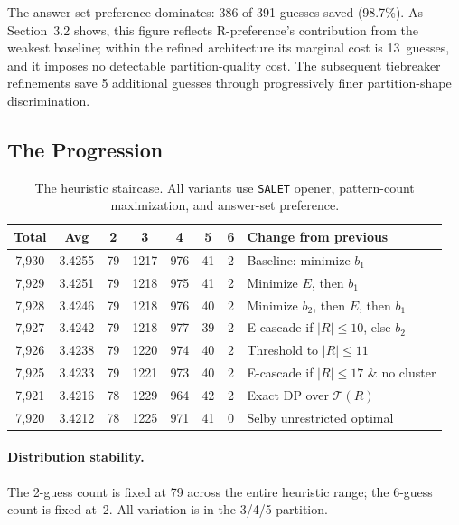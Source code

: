 \documentclass[11pt]{article}
\begin{document}
	The answer-set preference dominates: 386 of 391 guesses saved (98.7\%).  As Section~3.2 shows, this figure reflects R-preference's contribution from the weakest baseline; within the refined architecture its marginal cost is 13~guesses, and it imposes no detectable partition-quality cost.  The subsequent tiebreaker refinements save 5 additional guesses through progressively finer partition-shape discrimination.
	
	\subsection{The Progression}
	
	\begin{table}[h]
		\centering
		\caption{The heuristic staircase.  All variants use \texttt{SALET} opener, pattern-count maximization, and answer-set preference.}
		\label{tab:staircase}
		\begin{tabular}{@{}cccccccl@{}}
			\toprule
			Total & Avg & 2 & 3 & 4 & 5 & 6 & Change from previous \\
			\midrule
			7,930 & 3.4255 & 79 & 1217 & 976 & 41 & 2 & Baseline: minimize $b_1$ \\
			7,929 & 3.4251 & 79 & 1218 & 975 & 41 & 2 & Minimize $E$, then $b_1$ \\
			7,928 & 3.4246 & 79 & 1218 & 976 & 40 & 2 & Minimize $b_2$, then $E$, then $b_1$ \\
			7,927 & 3.4242 & 79 & 1218 & 977 & 39 & 2 & E-cascade if $|R| \leq 10$, else $b_2$ \\
			7,926 & 3.4238 & 79 & 1220 & 974 & 40 & 2 & Threshold to $|R| \leq 11$ \\
			7,925 & 3.4233 & 79 & 1221 & 973 & 40 & 2 & E-cascade if $|R| \leq 17$ \& no cluster \\
			\midrule
			7,921 & 3.4216 & 78 & 1229 & 964 & 42 & 2 & Exact DP over $\mathcal{T}(R)$ \\
			7,920 & 3.4212 & 78 & 1225 & 971 & 41 & 0 & Selby unrestricted optimal \\
			\bottomrule
		\end{tabular}
	\end{table}
	
	\paragraph{Distribution stability.}
	The 2-guess count is fixed at 79 across the entire heuristic range; the 6-guess count is fixed at~2.  All variation is in the 3/4/5 partition.
	
\end{document}
